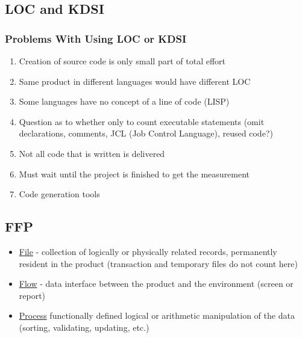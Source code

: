 \documentclass{report}
\begin{document}
			\subsection{LOC and KDSI}
				\subsubsection{Problems With Using LOC or KDSI}
					\begin{enumerate}
						\item Creation of source code is only small part of total effort
						\item Same product in different languages would have different LOC
						\item Some languages have no concept of a line of code (LISP)
						\item Question as to whether only to count executable statements (omit declarations, comments, JCL (Job Control Language), reused code?)
						\item Not all code that is written is delivered
						\item Must wait until the project is finished to get the measurement
						\item Code generation tools
					\end{enumerate}
			\subsection{FFP}
				\begin{itemize}
					\item \underline{File} - collection of logically or physically related records, permanently resident in the product (transaction and temporary files do not count here)
					\item \underline{Flow} - data interface between the product and the environment (screen or report)
					\item \underline{Process} functionally defined logical or arithmetic manipulation of the data (sorting, validating, updating, etc.)
				\end{itemize}
\end{document}
